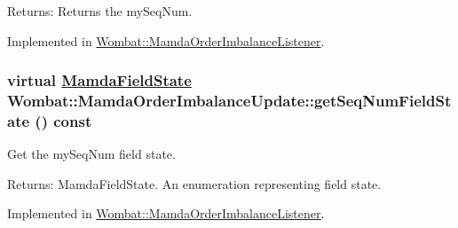 \begin{Desc}
\item[Returns:]Returns the my\-Seq\-Num. \end{Desc}


Implemented in \hyperlink{classWombat_1_1MamdaOrderImbalanceListener_dc73bf6c66194774ffd211ab9fb44b6c}{Wombat::Mamda\-Order\-Imbalance\-Listener}.\hypertarget{classWombat_1_1MamdaOrderImbalanceUpdate_28bbf6e096fdc25acd33a9efbc8f4690}{
\subsubsection[getSeqNumFieldState]{\setlength{\rightskip}{0pt plus 5cm}virtual \hyperlink{namespaceWombat_93aac974f2ab713554fd12a1fa3b7d2a}{Mamda\-Field\-State} Wombat::Mamda\-Order\-Imbalance\-Update::get\-Seq\-Num\-Field\-State () const}}
\label{classWombat_1_1MamdaOrderImbalanceUpdate_28bbf6e096fdc25acd33a9efbc8f4690}


Get the my\-Seq\-Num field state. 

\begin{Desc}
\item[Returns:]Mamda\-Field\-State. An enumeration representing field state. \end{Desc}


Implemented in \hyperlink{classWombat_1_1MamdaOrderImbalanceListener_59ef970a6b416d746105d9e766c1d1a8}{Wombat::Mamda\-Order\-Imbalance\-Listener}.